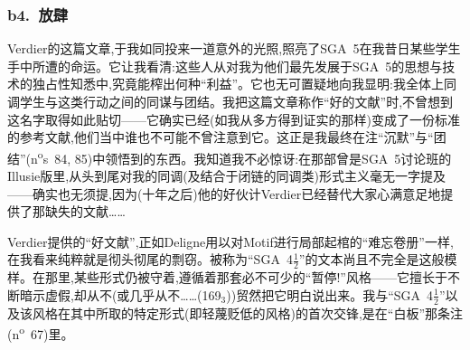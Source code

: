 \subsubsection*{b4.~放肆}


\dmark{}Verdier的这篇文章,于我如同投来一道意外的光照,照亮了SGA~5在我昔日某些学生手中所遭的命运。它让我看清:这些人从对我为他们最先发展于SGA~5的思想与技术的独占性知悉中,究竟能榨出何种“利益”。它也无可置疑地向我显明:我全体上同调学生与这类行动之间的同谋与团结。我把这篇文章称作“好的文献”时,不曾想到这名字取得如此贴切——它确实已经(如我从多方得到证实的那样)变成了一份标准的参考文献,他们当中谁也不可能不曾注意到它\dmark{}。这正是我最终在注“沉默”与“团结”(n\textsuperscript{o}s~84, 85)中领悟到的东西。我知道我不必惊讶:在那部曾是SGA~5讨论班的Illusie版里,从头到尾对我的同调(及结合于闭链的同调类)形式主义毫无一字提及——确实也无须提,因为(十年之后)他的好伙计Verdier已经替代大家心满意足地提供了那缺失的文献……

Verdier提供的“好文献”,正如Deligne用以对Motif进行局部起棺的“难忘卷册”一样,在我看来纯粹就是彻头彻尾的剽窃。被称为“SGA~4$\frac{1}{2}$”的文本尚且不完全是这般模样。在那里,某些形式仍被守着,遵循着那套必不可少的“暂停!”风格——它擅长于不断暗示虚假,却从不(或几乎从不……(169$_3$))贸然把它明白\dmark{}说出来。我与“SGA~4$\frac{1}{2}$”以及该风格在其中所取的特定形式(即轻蔑贬低的风格)的首次交锋,是在“白板”那条注(n\textsuperscript{o}~67)里。

